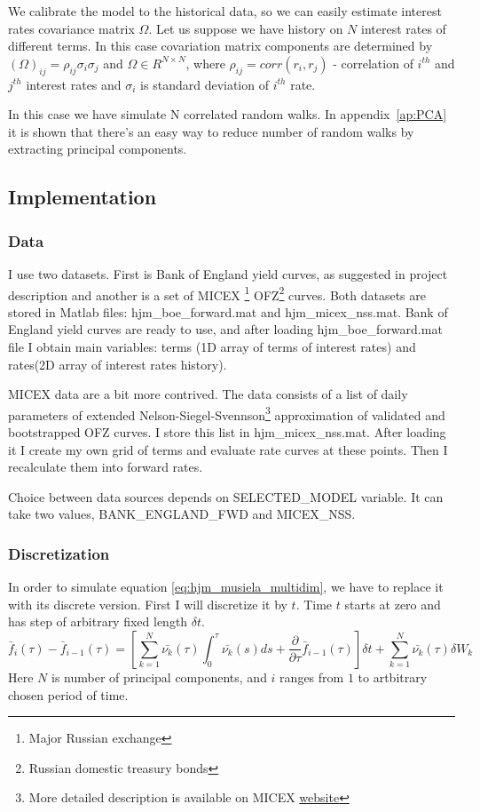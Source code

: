 \documentclass[11pt]{article} %
\begin{document}
We calibrate the model to the historical data, so we can easily estimate interest rates covariance matrix $\Omega$. Let us suppose we have history on $N$ interest rates of different terms. In this case covariation matrix components are determined by $(\Omega)_{ij} = \rho_{ij}\sigma_{i}\sigma_{j}$ and $\Omega \in R^{N \times N}$, where $\rho_{ij} = corr(r_i,r_j)$ - correlation of $i^{th}$ and $j^{th}$ interest rates and $\sigma_i$ is standard deviation of $i^{th}$ rate.

In this case we have simulate N correlated random walks. In appendix~\ref{ap:PCA} it is shown that there's an easy way to reduce number of random walks by extracting principal components.


\subsection{Implementation}
\subsubsection{Data}
I use two datasets. First is Bank of England yield curves, as suggested in project description and another is a set of MICEX \footnote{Major Russian exchange} OFZ\footnote{Russian domestic treasury bonds} curves. 
Both datasets are stored in Matlab files: hjm\_boe\_forward.mat and hjm\_micex\_nss.mat.
Bank of England yield curves are ready to use, and after loading hjm\_boe\_forward.mat file I obtain main variables: terms (1D array of terms of interest rates) and rates(2D array of interest rates history). 

MICEX data are a bit more contrived. The data consists of a list of daily parameters of extended Nelson-Siegel-Svennson\footnote{More detailed description is available on MICEX \href{http://rts.micex.ru/a80}{website}} approximation of validated and bootstrapped OFZ curves. I store this list in hjm\_micex\_nss.mat. After loading it I create my own grid of terms and evaluate rate curves at these points. Then I recalculate them into forward rates.

Choice between data sources depends on SELECTED\_MODEL variable. It can take two values, BANK\_ENGLAND\_FWD and MICEX\_NSS.

\subsubsection{Discretization}
In order to simulate equation \eqref{eq:hjm_musiela_multidim}, we have to replace it with its discrete version. First I will discretize it by $t$. Time $t$ starts at zero and has step of arbitrary fixed length $\delta t$.
\begin{equation}
\bar{f}_i(\tau) - \bar{f}_{i-1}(\tau) = \left[\sum_{k=1}^N\bar{\nu_k}(\tau)\int_{0}^{\tau}\bar{\nu_k}(s)ds+ \frac{\partial}{\partial \tau}\bar{f}_{i-1}(\tau)\right]\delta t + \sum_{k=1}^N\bar{\nu_k}(\tau)\delta W_{k}
\end{equation}
Here $N$ is number of principal components, and $i$ ranges from $1$ to artbitrary chosen period of time.
\end{document}
